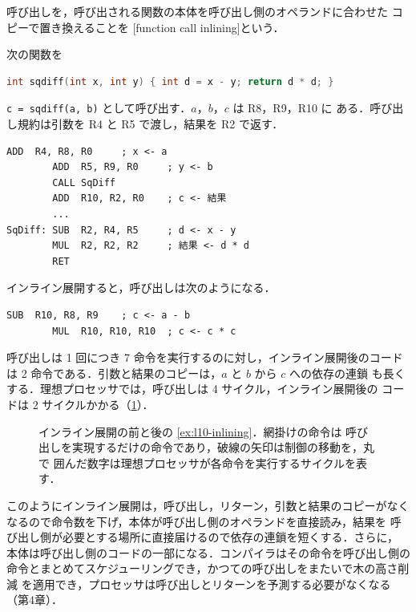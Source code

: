 \documentclass[../main.tex]{subfiles}
\begin{document}
\begin{definition}[インライン展開]
  \label{def:l10-inlining}
  呼び出しを，呼び出される関数の本体を呼び出し側のオペランドに合わせた
  コピーで置き換えることを
  [function call inlining]という．%
\end{definition}

\begin{example}
  \label{ex:l10-inlining}
  次の関数を
  \begin{lstlisting}[language=C, numbers=none]
int sqdiff(int x, int y) { int d = x - y; return d * d; }
\end{lstlisting}
  \texttt{c = sqdiff(a, b)} として呼び出す．$a$，$b$，$c$ は R8，R9，R10 に
  ある．呼び出し規約は引数を R4 と R5 で渡し，結果を R2 で返す．
  \begin{lstlisting}[language={[x86masm]Assembler}, numbers=none]
        ADD  R4, R8, R0     ; x <- a
        ADD  R5, R9, R0     ; y <- b
        CALL SqDiff
        ADD  R10, R2, R0    ; c <- 結果
        ...
SqDiff: SUB  R2, R4, R5     ; d <- x - y
        MUL  R2, R2, R2     ; 結果 <- d * d
        RET
\end{lstlisting}
  インライン展開すると，呼び出しは次のようになる．
  \begin{lstlisting}[language={[x86masm]Assembler}, numbers=none]
        SUB  R10, R8, R9    ; c <- a - b
        MUL  R10, R10, R10  ; c <- c * c
\end{lstlisting}
  呼び出しは 1 回につき 7 命令を実行するのに対し，インライン展開後のコード
  は 2 命令である．引数と結果のコピーは，$a$ と $b$ から $c$ への依存の連鎖
  も長くする．理想プロセッサでは，呼び出しは 4 サイクル，インライン展開後の
  コードは 2 サイクルかかる（\cref{fig:l10-inlining}）．
\end{example}

\begin{figure}[htbp]
  \centering
  
  \caption{インライン展開の前と後の \cref{ex:l10-inlining}．網掛けの命令は
    呼び出しを実現するだけの命令であり，破線の矢印は制御の移動を，丸で
    囲んだ数字は理想プロセッサが各命令を実行するサイクルを表す．}
  \label{fig:l10-inlining}
\end{figure}

このようにインライン展開は，呼び出し，リターン，引数と結果のコピーがなく
なるので命令数を下げ，本体が呼び出し側のオペランドを直接読み，結果を
呼び出し側が必要とする場所に直接届けるので依存の連鎖を短くする．さらに，
本体は呼び出し側のコードの一部になる．コンパイラはその命令を呼び出し側の
命令とまとめてスケジューリングでき，かつての呼び出しをまたいで木の高さ削減
を適用でき，プロセッサは呼び出しとリターンを予測する必要がなくなる
（第4章）．
\end{document}
